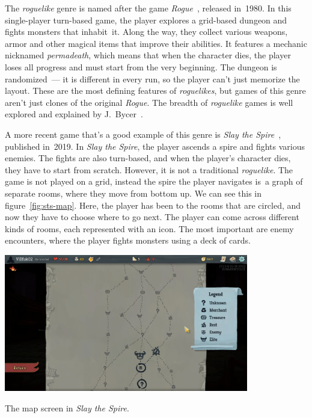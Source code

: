 The \emph{roguelike} genre is named after the game \emph{Rogue}~\cite{RogueWiki}, released in~1980.
In this single-player turn-based game, the player explores a grid-based dungeon and fights monsters that inhabit~it.
Along the way, they collect various weapons, armor and other magical items that improve their abilities.
It features a mechanic nicknamed \emph{permadeath}, which means that when the character dies, the player loses all progress and must start from the very beginning.
The dungeon is randomized~--- it is different in every run, so the player can't just memorize the layout.
These are the most defining features of \emph{roguelikes}, but games of this genre aren't just clones of the original \emph{Rogue}.
The breadth of \emph{roguelike} games is well explored and explained by J.~Bycer~\cite{roguelikeBycer}.

A more recent game that's a good example of this genre is \emph{Slay the Spire}~\cite{StSWiki}, published in~2019.
In \emph{Slay the Spire}, the player ascends a spire and fights various enemies.
The fights are also turn-based, and when the player's character dies, they have to start from scratch.
However, it is not a traditional \emph{roguelike}.
The game is not played on a grid, instead the spire the player navigates is~a graph of separate rooms, where they move from bottom up.
We can see this in figure~\ref{fig:sts-map}.
Here, the player has been to the rooms that are circled, and now they have to choose where to go next.
The player can come across different kinds of rooms, each represented with an icon.
The most important are enemy encounters, where the player fights monsters using a deck of cards.

\begin{center}
    \captionsetup{type=figure}
    \includegraphics[width=0.8\textwidth]{img/Slay-the-Spire-Map.png}
    \caption{The map screen in \emph{Slay the Spire}.}
    \label{fig:sts-map}
\end{center}


